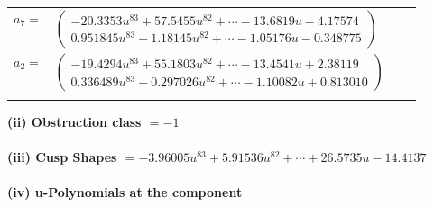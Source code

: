 \documentclass[1p]{elsarticle_modified}
\theoremstyle{definition}
\begin{document}
\begin{tabular}{m{7pt} m{180pt} m{7pt} m{180pt} }
\flushright $a_{7}=$&$\begin{pmatrix}-20.3353 u^{83}+57.5455 u^{82}+\cdots-13.6819 u-4.17574\\0.951845 u^{83}-1.18145 u^{82}+\cdots-1.05176 u-0.348775\end{pmatrix}$ \\
\flushright $a_{2}=$&$\begin{pmatrix}-19.4294 u^{83}+55.1803 u^{82}+\cdots-13.4541 u+2.38119\\0.336489 u^{83}+0.297026 u^{82}+\cdots-1.10082 u+0.813010\end{pmatrix}$\\&\end{tabular}
\flushleft \textbf{(ii) Obstruction class $= -1$}\\~\\
\flushleft \textbf{(iii) Cusp Shapes $= -3.96005 u^{83}+5.91536 u^{82}+\cdots+26.5735 u-14.4137$}\\~\\
\newpage\renewcommand{\arraystretch}{1}
\flushleft \textbf{(iv) u-Polynomials at the component}\newline \\
\end{document}

